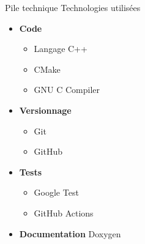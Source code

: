 \documentclass[french, 12pt]{beamer}
\begin{document}
\begin{frame}{Pile technique}
Technologies utilisées
\begin{itemize}
    \item \textbf{Code}
    \begin{itemize}
        \item Langage C++
        \item CMake
        \item GNU C Compiler
    \end{itemize}
    \item \textbf{Versionnage}
    \begin{itemize}
        \item Git
        \item GitHub
    \end{itemize}
    \item \textbf{Tests}
    \begin{itemize}
        \item Google Test
        \item GitHub Actions
    \end{itemize}
    \item \textbf{Documentation} Doxygen
\end{itemize}
\end{frame}
\end{document}
